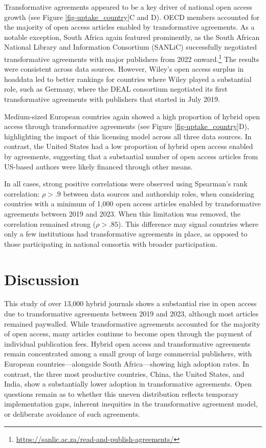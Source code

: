 \documentclass[a4paper,man,floatsintext,longtable,noextraspace,10pt]{apa6}
\begin{document}
Transformative agreements appeared to be a key driver of national open
access growth (see Figure \ref{fig-uptake_country}C and D). OECD members
accounted for the majority of open access articles enabled by
transformative agreements. As a notable exception, South Africa again
featured prominently, as the South African National Library and
Information Consortium (SANLiC) successfully negotiated transformative
agreements with major publishers from 2022 onward.\footnote{\url{https://sanlic.ac.za/read-and-publish-agreements/}}
The results were consistent across data sources. However, Wiley's open
access surplus in hoaddata led to better rankings for countries where
Wiley played a substantial role, such as Germany, where the DEAL
consortium negotiated its first transformative agreements with
publishers that started in July 2019.

Medium-sized European countries again showed a high proportion of hybrid
open access through transformative agreements (see Figure
\ref{fig-uptake_country}D), highlighting the impact of this licensing
model across all three data sources. In contrast, the United States had
a low proportion of hybrid open access enabled by agreements, suggesting
that a substantial number of open access articles from US-based authors
were likely financed through other means.

In all cases, strong positive correlations were observed using
Spearman's rank correlation: \(\rho > .9\) between data sources and
authorship roles, when considering countries with a minimum of 1,000
open access articles enabled by transformative agreements between 2019
and 2023. When this limitation was removed, the correlation remained
strong (\(\rho > .85\)). This difference may signal countries where only
a few institutions had transformative agreements in place, as opposed to
those participating in national consortia with broader participation.

\section{Discussion}\label{discussion}

This study of over 13,000 hybrid journals shows a substantial rise in
open access due to transformative agreements between 2019 and 2023,
although most articles remained paywalled. While transformative
agreements accounted for the majority of open access, many articles
continue to become open through the payment of individual publication
fees. Hybrid open access and transformative agreements remain
concentrated among a small group of large commercial publishers, with
European countries---alongside South Africa---showing high adoption
rates. In contrast, the three most productive countries, China, the
United States, and India, show a substantially lower adoption in
transformative agreements. Open questions remain as to whether this
uneven distribution reflects temporary implementation gaps, inherent
inequities in the transformative agreement model, or deliberate
avoidance of such agreements.
\end{document}
